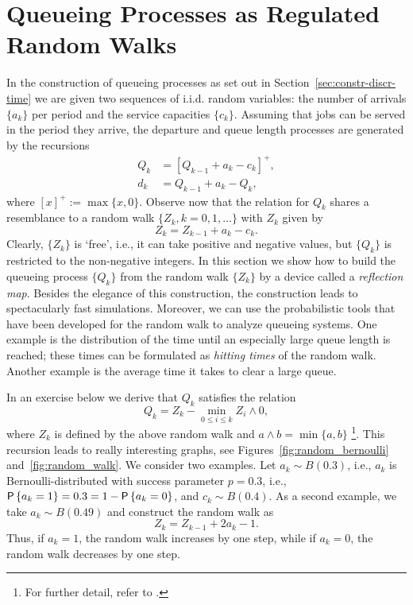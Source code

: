 \section{Queueing Processes as Regulated Random Walks}
\label{sec:queu-proc-as}

In the construction of queueing processes as set out in
Section~\ref{sec:constr-discr-time} we are given two sequences of
i.i.d. random variables: the number of arrivals $\{a_k\}$ per period
and the service capacities $\{c_k\}$. Assuming that jobs can be served
in the period they arrive, the departure and queue length processes
are generated by the recursions
\begin{equation}\label{eq:5}
  \begin{split}
  Q_k &= [Q_{k-1}+a_k - c_k]^+,\\
  d_k &= Q_{k-1} +a_k- Q_{k},
  \end{split}
\end{equation}
where $[x]^+ := \max\{x, 0\}$.  Observe now that the relation for $Q_k$
shares a resemblance to a random walk $\{Z_k, k=0,1,\ldots\}$ with  $Z_k$ 
given by
\begin{equation*}
  Z_k = Z_{k-1} + a_k - c_k.
\end{equation*}
Clearly, $\{Z_k\}$ is `free', i.e., it can take positive and negative
values, but $\{Q_k\}$ is restricted to the non-negative integers.  In
this section we show how to build the queueing process $\{Q_k\}$ from
the random walk $\{Z_k\}$ by a device called a \emph{reflection map}.
Besides the elegance of this construction, the construction leads to
spectacularly fast simulations. Moreover, we can use the probabilistic
tools that have been developed for the random walk to analyze queueing
systems. One example is the distribution of the time until an
especially large queue length is reached; these times can be
formulated as \emph{hitting times} of the random walk. Another example
is the average time it takes to clear a large queue.

In an exercise  below we derive that $Q_k$ satisfies the relation
\begin{equation}\label{eq:reich1}
  Q_k = Z_k - \min_{0\leq i \leq k} Z_i\wedge 0,
\end{equation}
where $Z_k$ is defined by the above random walk and
$a\wedge b = \min\{a,b\}$ \footnote{For further detail, refer to
  \citet{baccelli88:_sampl_m_m}.}.  This recursion leads to really
interesting graphs, see Figures~\ref{fig:random_bernoulli}
and~\ref{fig:random_walk}. We consider two examples. Let
$a_k \sim B(0.3)$, i.e., $a_k$ is Bernoulli-distributed with success
parameter $p=0.3$, i.e., $\P{a_k = 1} = 0.3 = 1- \P{a_k=0}$, and
$c_k \sim B(0.4)$. As a second example, we take $a_k\sim B(0.49)$ and
construct the random walk as
\begin{equation*}
  Z_k = Z_{k-1} + 2 a_k -1.
\end{equation*}
Thus, if $a_k=1$, the random walk increases by one step, while if
$a_k=0$, the random walk decreases by one step. 


